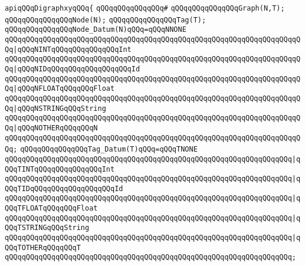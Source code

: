 \newline
\verb|apiqQQqDigraphxyqQQq{|\newline
\verb|qQQqqQQqqQQqqQQq#|\newline
\verb|qQQqqQQqqQQqqQQqGraph(N,T);|\newline
\verb|qQQqqQQqqQQqqQQqNode(N);|\newline
\verb|qQQqqQQqqQQqqQQqTag(T);|\newline
\newline
\verb|qQQqqQQqqQQqqQQqNode_Datum(N)qQQq=qQQqNNONE|\newline
\verb|qQQqqQQqqQQqqQQqqQQqqQQqqQQqqQQqqQQqqQQqqQQqqQQqqQQqqQQqqQQqqQQqqQQqqQQq|\verb#|qQQqNINTqQQqqQQqqQQqqQQqInt#\newline
\verb|qQQqqQQqqQQqqQQqqQQqqQQqqQQqqQQqqQQqqQQqqQQqqQQqqQQqqQQqqQQqqQQqqQQqqQQq|\verb#|qQQqNIDqQQqqQQqqQQqqQQqqQQqId#\newline
\verb|qQQqqQQqqQQqqQQqqQQqqQQqqQQqqQQqqQQqqQQqqQQqqQQqqQQqqQQqqQQqqQQqqQQqqQQq|\verb#|qQQqNFLOATqQQqqQQqFloat#\newline
\verb|qQQqqQQqqQQqqQQqqQQqqQQqqQQqqQQqqQQqqQQqqQQqqQQqqQQqqQQqqQQqqQQqqQQqqQQq|\verb#|qQQqNSTRINGqQQqString#\newline
\verb|qQQqqQQqqQQqqQQqqQQqqQQqqQQqqQQqqQQqqQQqqQQqqQQqqQQqqQQqqQQqqQQqqQQqqQQq|\verb#|qQQqNOTHERqQQqqQQqN#\newline
\verb|qQQqqQQqqQQqqQQqqQQqqQQqqQQqqQQqqQQqqQQqqQQqqQQqqQQqqQQqqQQqqQQqqQQqqQQq;|\newline
\newline
\verb|qQQqqQQqqQQqqQQqTag_Datum(T)qQQq=qQQqTNONE|\newline
\verb|qQQqqQQqqQQqqQQqqQQqqQQqqQQqqQQqqQQqqQQqqQQqqQQqqQQqqQQqqQQqqQQqqQQq|\verb#|qQQqTINTqQQqqQQqqQQqqQQqInt#\newline
\verb|qQQqqQQqqQQqqQQqqQQqqQQqqQQqqQQqqQQqqQQqqQQqqQQqqQQqqQQqqQQqqQQqqQQq|\verb#|qQQqTIDqQQqqQQqqQQqqQQqqQQqId#\newline
\verb|qQQqqQQqqQQqqQQqqQQqqQQqqQQqqQQqqQQqqQQqqQQqqQQqqQQqqQQqqQQqqQQqqQQq|\verb#|qQQqTFLOATqQQqqQQqFloat#\newline
\verb|qQQqqQQqqQQqqQQqqQQqqQQqqQQqqQQqqQQqqQQqqQQqqQQqqQQqqQQqqQQqqQQqqQQq|\verb#|qQQqTSTRINGqQQqString#\newline
\verb|qQQqqQQqqQQqqQQqqQQqqQQqqQQqqQQqqQQqqQQqqQQqqQQqqQQqqQQqqQQqqQQqqQQq|\verb#|qQQqTOTHERqQQqqQQqT#\newline
\verb|qQQqqQQqqQQqqQQqqQQqqQQqqQQqqQQqqQQqqQQqqQQqqQQqqQQqqQQqqQQqqQQqqQQq;|\newline
\newline
